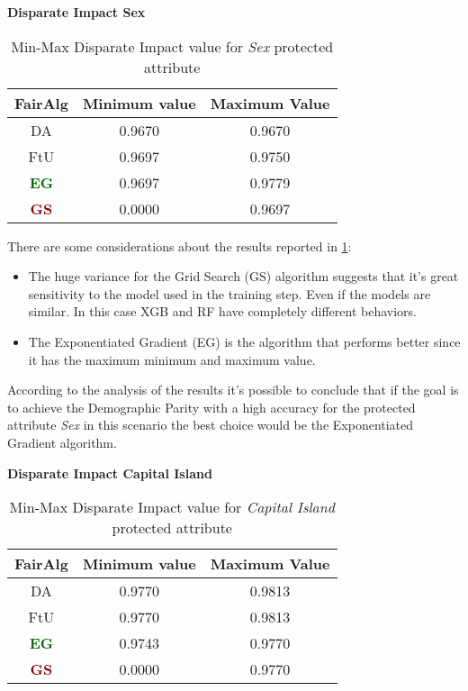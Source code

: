 \textbf{Disparate Impact Sex}
\begin{table}
    \centering
    \begin{tabular}{|c|c|c|}
        \hline
        \textbf{FairAlg} & \textbf{Minimum value} & \textbf{Maximum Value} \\
        \hline
        DA & 0.9670 & 0.9670 \\
        \hline
        FtU & 0.9697 & 0.9750 \\
        \hline
        \textcolor{darkgreen}{\textbf{EG}} & 0.9697 & 0.9779 \\
        \hline
        \textcolor{darkred}{\textbf{GS}} & 0.0000 & 0.9697 \\
        \hline
    \end{tabular}
    \caption{Min-Max Disparate Impact value for \emph{Sex} protected attribute}
    \label{tab:s_di}
\end{table}

There are some considerations about the results reported in \cref{tab:s_di}:

\begin{itemize}

    \item The huge variance for the Grid Search (GS) algorithm suggests that it's great sensitivity to the model used in the training step. Even if the models are similar. In this case XGB and RF have completely different behaviors.

    \item The Exponentiated Gradient (EG) is the algorithm that performs better since it has the maximum minimum and maximum value.

\end{itemize}

According to the analysis of the results it's possible to conclude that if the goal is to achieve the Demographic Parity with a high accuracy for the protected attribute \emph{Sex} in this scenario the best choice would be the Exponentiated Gradient algorithm.


\textbf{Disparate Impact Capital Island}
\begin{table}
    \centering
    \begin{tabular}{|c|c|c|}
        \hline
        \textbf{FairAlg} & \textbf{Minimum value} & \textbf{Maximum Value} \\
        \hline
        DA & 0.9770 & 0.9813 \\
        \hline
        FtU & 0.9770 & 0.9813 \\
        \hline
        \textcolor{darkgreen}{\textbf{EG}} & 0.9743 & 0.9770 \\
        \hline
        \textcolor{darkred}{\textbf{GS}} & 0.0000 & 0.9770 \\
        \hline
    \end{tabular}
    \caption{Min-Max Disparate Impact value for \emph{Capital Island} protected attribute}
    \label{tab:ci_di}
\end{table}

